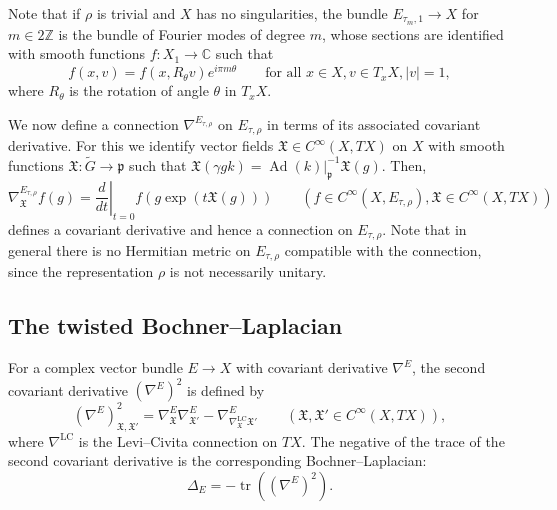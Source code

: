 \documentclass[10pt]{amsart}
\theoremstyle{plain}
\theoremstyle{definition}
\theoremstyle{remark}
\newcommand{\Z}{\mathbb{Z}}
\newcommand{\C}{\mathbb{C}}
\DeclareMathOperator{\tr}{tr}
\DeclareMathOperator{\Ad}{Ad}
\numberwithin{equation}{section}
\begin{document}
Note that if $\rho$ is trivial and $X$ has no singularities, the bundle $E_{\tau_m,1}\to X$ for $m\in2\Z$ is the bundle of Fourier modes of degree $m$, whose sections are identified with smooth functions $f : X_1 \to \C$ such that
\[
f(x,v) = f (x,R_\theta v)e^{i\pi m\theta} \qquad \mbox{for all }x\in X,v\in T_xX,|v|=1,
\]
where $R_\theta$ is the rotation of angle $\theta$ in $T_xX$.

We now define a connection $\nabla^{E_{\tau,\rho}}$ on $E_{\tau,\rho}$ in terms of its associated covariant derivative. For this we identify vector fields $\mathfrak X\in C^\infty(X,TX)$ on $X$ with smooth functions $\mathfrak X:\widetilde{G}\to\mathfrak{p}$ such that $\mathfrak X(\gamma gk)=\Ad(k)|_{\mathfrak{p}}^{-1}\mathfrak X(g)$. Then,
\[
\nabla^{E_{\tau,\rho}}_{\mathfrak X}f(g) = \left.\frac{d}{dt}\right|_{t=0}f(g\exp(t\mathfrak X(g))) \qquad (f\in C^\infty(X,E_{\tau,\rho}),\mathfrak X\in C^\infty(X,TX))
\]
defines a covariant derivative and hence a connection on $E_{\tau,\rho}$. Note that in general there is no Hermitian metric on $E_{\tau,\rho}$ compatible with the connection, since the representation $\rho$ is not necessarily unitary.

\subsection{The twisted Bochner--Laplacian}
\label{subsec:Laplacians}

For a complex vector bundle $E\to X$ with covariant derivative $\nabla^E$, the second covariant derivative $(\nabla^E)^2$ is defined by
\[
(\nabla^E)^2_{\mathfrak X,\mathfrak X'} = \nabla_{\mathfrak X}^E\nabla_{\mathfrak X'}^E-\nabla^E_{\nabla_{\mathfrak X}^{\operatorname{LC}}\mathfrak X'} \qquad (\mathfrak X,\mathfrak X'\in C^\infty(X,TX)),
\]
where $\nabla^{\operatorname{LC}}$ is the Levi--Civita connection on $TX$.
The negative of the trace of the second covariant derivative is the corresponding Bochner--Laplacian:
\[
\Delta_E = -\tr\left((\nabla^E)^2\right).
\]
\end{document}
